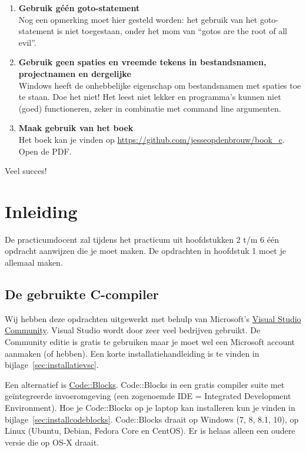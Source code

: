 \documentclass[a4paper,10pt,fleqn,twoside]{article}
\begin{document}
\begin{enumerate}[label=\textbf{\arabic*.}]
Als je niet begrijpt waar het programma fout gaat, steek dan niet direct je hand omhoog. Zet in je code op de plek waar het programma vermoedelijk nog correct werkt een \textsl{breakpoint}\footnote{In de les wordt uitgelegd hoe je dit moet doen.}. Als het programma tijdens het debuggen is gestopt op de plek van de breakpoint, controleer dan goed de inhoud van alle actuele variabelen. Dit is één van de krachtigste manieren om fouten te detecteren en om tot een werkend programma te komen.
\item \textbf{Gebruik géén goto-statement}\\
Nog een opmerking moet hier gesteld worden: het gebruik van het goto-statement is niet toegestaan, onder het mom van ``gotos are the root of all evil''.
\item \textbf{Gebruik geen spaties en vreemde tekens in bestandsnamen, projectnamen en dergelijke}\\
Windows heeft de onhebbelijke eigenschap om bestandsnamen met spaties toe te staan. Doe het niet! Het leest niet lekker en programma’s kunnen niet (goed) functioneren, zeker in combinatie met command line argumenten.
\item \textbf{Maak gebruik van het boek}\\ Het boek kan je vinden op \url{https://github.com/jesseopdenbrouw/book_c}. Open de PDF.
\end{enumerate}


Veel succes!


\clearpage
\section{Inleiding}

De practicumdocent zal tijdens het practicum uit hoofdstukken 2 t/m 6 één opdracht aanwijzen die je moet maken. De opdrachten in hoofdstuk 1 moet je allemaal maken. 

\subsection{De gebruikte C-compiler}
Wij hebben deze opdrachten uitgewerkt met behulp van Microsoft’s \href{https://visualstudio.microsoft.com/vs/community/}{Visual Studio Community}. Visual Studio wordt door zeer veel bedrijven gebruikt. De Community editie is gratis te gebruiken maar je moet wel een Microsoft account aanmaken (of hebben). Een korte installatiehandleiding is te vinden in bijlage~\ref{sec:installatievsc}.

Een alternatief is \href{http://www.codeblocks.org/}{Code::Blocks}. Code::Blocks in een gratis compiler suite met geïntegreerde invoeromgeving (een zogenoemde IDE = Integrated Development Environment). Hoe je Code::Blocks op je laptop kan installeren kun je vinden in bijlage~\ref{sec:installcodeblocks}. Code::Blocks draait op Windows (7, 8, 8.1, 10), op Linux (Ubuntu, Debian, Fedora Core en CentOS). Er is helaas alleen een oudere versie die op OS-X draait.
\end{document}
